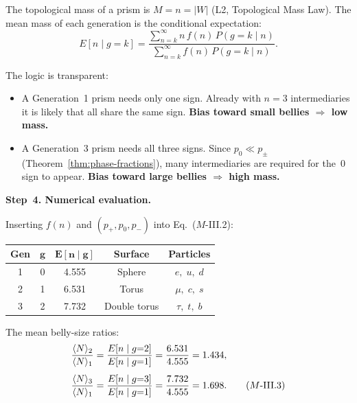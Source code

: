 The topological mass of a prism is $M = n = |W|$ (L2, Topological Mass
Law). The mean mass of each generation is the conditional expectation:
\begin{equation}
  E[n \mid g = k]
  = \frac{\displaystyle\sum_{n=k}^{\infty} n\,f(n)\,P(g{=}k \mid n)}
         {\displaystyle\sum_{n=k}^{\infty} f(n)\,P(g{=}k \mid n)}.
  \tag{$M$-III.2}
\end{equation}

The logic is transparent:
\begin{itemize}
  \item A Generation~1 prism needs only one sign. Already with $n = 3$
        intermediaries it is likely that all share the same sign.
        \textbf{Bias toward small bellies $\Longrightarrow$ low mass.}
  \item A Generation~3 prism needs all three signs. Since
        $p_0 \ll p_\pm$ (Theorem~\ref{thm:phase-fractions}), many
        intermediaries are required for the~$0$ sign to appear.
        \textbf{Bias toward large bellies $\Longrightarrow$ high mass.}
\end{itemize}

\bigskip
\noindent
\textbf{Step~4. Numerical evaluation.}

Inserting $f(n)$ and $(p_+, p_0, p_-)$ into Eq.~($M$-III.2):
\begin{center}
\renewcommand{\arraystretch}{1.3}
\begin{tabular}{ccccc}
\toprule
\textbf{Gen} & $\boldsymbol{g}$ & $\boldsymbol{E[n \mid g]}$
  & \textbf{Surface} & \textbf{Particles} \\
\midrule
1 & 0 & 4.555 & Sphere      & $e,\; u,\; d$ \\
2 & 1 & 6.531 & Torus       & $\mu,\; c,\; s$ \\
3 & 2 & 7.732 & Double torus  & $\tau,\; t,\; b$ \\
\bottomrule
\end{tabular}
\end{center}

The mean belly-size ratios:
\begin{align}
  \frac{\langle N\rangle_2}{\langle N\rangle_1}
  &= \frac{E[n \mid g{=}2]}{E[n \mid g{=}1]}
  = \frac{6{.}531}{4{.}555}
  = 1{.}434, \notag\\[4pt]
  \frac{\langle N\rangle_3}{\langle N\rangle_1}
  &= \frac{E[n \mid g{=}3]}{E[n \mid g{=}1]}
  = \frac{7{.}732}{4{.}555}
  = 1{.}698.
  \tag{$M$-III.3}
\end{align}

